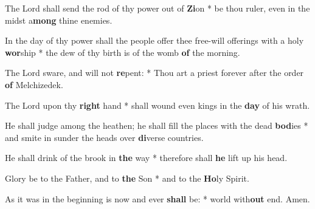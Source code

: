 \begin{multicols}{2}
	The Lord shall send the rod of thy power out of \textbf{Zi}on * be thou ruler, even in the midst a\textbf{mong} thine enemies.
	
	In the day of thy power shall the people offer thee free-will offerings with a holy \textbf{wor}ship * the dew of thy birth is of the womb \textbf{of} the morning.
	
	The Lord sware, and will not \textbf{re}pent: * Thou art a priest forever after the order \textbf{of} Melchizedek.
	
	The Lord upon thy \textbf{right} hand * shall wound even kings in the \textbf{day} of his wrath.
	
	He shall judge among the heathen; he shall fill the places with the dead \textbf{bod}ies * and smite in sunder the heads over \textbf{di}verse countries.
	
	He shall drink of the brook in \textbf{the} way * therefore shall \textbf{he} lift up his head.
	
	Glory be to the Father, and to \textbf{the} Son * and to the \textbf{Ho}ly Spirit.
	
	As it was in the beginning is now and ever \textbf{shall} be: * world with\textbf{out} end. Amen.
\end{multicols}